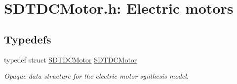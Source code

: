 \hypertarget{group__dcmotor}{}\section{S\+D\+T\+D\+C\+Motor.\+h\+: Electric motors}
\label{group__dcmotor}
\subsection*{Typedefs}
\begin{DoxyCompactItemize}
\item 
\hypertarget{group__dcmotor_ga55042fc98f1704ef2f8dd270e90c4cef}{}typedef struct \hyperlink{group__dcmotor_ga55042fc98f1704ef2f8dd270e90c4cef}{S\+D\+T\+D\+C\+Motor} \hyperlink{group__dcmotor_ga55042fc98f1704ef2f8dd270e90c4cef}{S\+D\+T\+D\+C\+Motor}\label{group__dcmotor_ga55042fc98f1704ef2f8dd270e90c4cef}

\begin{DoxyCompactList}\small\item\em Opaque data structure for the electric motor synthesis model. \end{DoxyCompactList}\end{DoxyCompactItemize}
